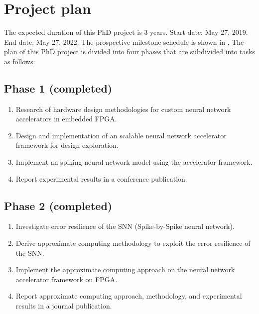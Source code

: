 \section{Project plan}
The expected duration of this PhD project is 3 years. Start date: May 27, 2019. End date: May 27, 2022. The prospective milestone schedule is shown in . The plan of this PhD project is divided into four phases that are subdivided into tasks as follows:

\subsection{Phase 1 (completed)}
\begin{enumerate}
\item Research of hardware design methodologies for custom neural network accelerators in embedded FPGA.
\item Design and implementation of an scalable neural network accelerator framework for design exploration.
\item Implement an spiking neural network model using the accelerator framework.
\item Report experimental results in a conference publication.
\end{enumerate}

\subsection{Phase 2 (completed)}
\begin{enumerate}
	\item Investigate error resilience of the SNN (Spike-by-Spike neural network).
	\item Derive approximate computing methodology to exploit the error resilience of the SNN.
	\item Implement the approximate computing approach on the neural network accelerator framework on FPGA.
	\item Report approximate computing approach, methodology, and experimental results in a journal publication.
\end{enumerate}

